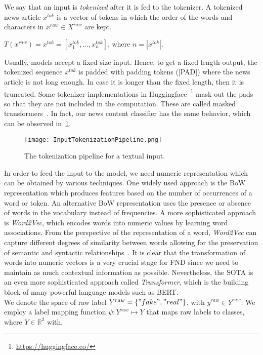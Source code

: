 We say that an input is \emph{tokenized} after it is fed to the tokenizer. A tokenized news article $x^{tok}$ is a vector of tokens in which the order of the words and characters in $x^{raw} \in X^{raw}$ are kept.
\begin{center}
    $T(x^{raw}) = x^{tok} = [x_1^{tok}, \dots, x_n^{tok}]$, where $n = |x^{tok}|$.
\end{center}
Usually, models accept a fixed size input. Hence, to get a fixed length output, the tokenized sequence $x^{tok}$ is padded with padding tokens ([PAD]) where the news article is not long enough. In case it is longer than the fixed length, then it is truncated. Some tokenizer implementations in Huggingface~\footnote{\url{https://huggingface.co/}} mask out the pads so that they are not included in the computation. These are called masked transformers~\parencite{Transformers_Wolf}. In fact, our news content classifier has the same behavior, which can be observed in~\ref{fig:InputTokenizationPipeline}.\\
\begin{figure}
    \centering
    \texttt{[image: InputTokenizationPipeline.png]}
    \caption[The tokenization pipeline for a textual input.]{The tokenization pipeline for a textual input.}
    \label{fig:InputTokenizationPipeline}
\end{figure}
In order to feed the input to the model, we need numeric representation which can be obtained by various techniques. One widely used approach is the BoW representation which produces features based on the number of occurrences of a word or token. An alternative BoW representation uses the presence or absence of words in the vocabulary instead of frequencies. A more sophisticated approach is \emph{Word2Vec}, which encodes words into numeric values by learning word associations. From the perspective of the representation of a word, \emph{Word2Vec} can capture different degrees of similarity between words allowing for the preservation of semantic and syntactic relationships~\parencite{Word2Vec_Mikolov}. It is clear that the transformation of words into numeric vectors is a very crucial stage for FND since we need to maintain as much contextual information as possible. Nevertheless, the SOTA is an even more sophisticated approach called \emph{Transformer}, which is the building block of many powerful language models such as BERT.\\
We denote the space of raw label $Y^{raw} = \{"fake", "real"\}$, with $y^{raw} \in Y^{raw}$. We employ a label mapping function $\psi: Y^{raw} \mapsto Y$ that maps raw labels to classes, where $Y \in \mathbb{R}^2$ with,
